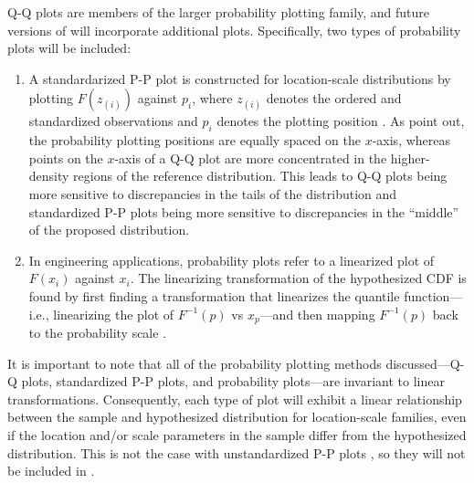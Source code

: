 Q-Q plots are members of the larger probability plotting family, and
future versions of  will incorporate additional plots.
Specifically, two types of probability plots will be included:

\begin{enumerate}
\def\labelenumi{\arabic{enumi}.}
\tightlist
\item
  A standardarized P-P plot is constructed for location-scale
  distributions by plotting \(F(z_{(i)})\) against \(p_i\), where
  \(z_{(i)}\) denotes the ordered and standardized observations and
  \(p_i\) denotes the plotting position \citep{Gan1991-yk}. As
  \citet{Gan1991-yk} point out, the probability plotting positions are
  equally spaced on the \(x\)-axis, whereas points on the \(x\)-axis of
  a Q-Q plot are more concentrated in the higher-density regions of the
  reference distribution. This leads to Q-Q plots being more sensitive
  to discrepancies in the tails of the distribution and standardized P-P
  plots being more sensitive to discrepancies in the ``middle'' of the
  proposed distribution.
\item
  In engineering applications, probability plots refer to a linearized
  plot of \(F(x_i)\) against \(x_i\). The linearizing transformation of
  the hypothesized CDF is found by first finding a transformation that
  linearizes the quantile function---i.e., linearizing the plot of
  \(F^{-1}(p)\) vs \(x_p\)---and then mapping \(F^{-1}(p)\) back to the
  probability scale \citep[cf.][Chapter 6]{Meeker1998}.
\end{enumerate}

It is important to note that all of the probability plotting methods
discussed---Q-Q plots, standardized P-P plots, and probability
plots---are invariant to linear transformations. Consequently, each type
of plot will exhibit a linear relationship between the sample and
hypothesized distribution for location-scale families, even if the
location and/or scale parameters in the sample differ from the
hypothesized distribution. This is not the case with unstandardized P-P
plots \citep{Wilk1968-ii}, so they will not be included in
.

